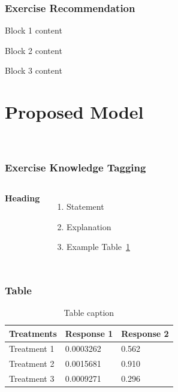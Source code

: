 \documentclass{beamer}
\begin{document}

\begin{frame}
  \frametitle{Exercise Recommendation}
  \begin{block}{Block 1}
    content
  \end{block}

  \begin{block}{Block 2}
    content
  \end{block}

  \begin{block}{Block 3}
    content
  \end{block}
\end{frame}

\section{Proposed Model}
\begin{frame}
  \
\end{frame}




\begin{frame}
  \frametitle{Exercise Knowledge Tagging}
  \begin{columns}[c] %

    \textbf{Heading}
    \begin{enumerate}
      \item Statement
      \item Explanation
      \item Example Table~\ref{tbl:t1}
    \end{enumerate}



  \end{columns}
\end{frame}

\begin{frame}
  \frametitle{Table}
  \begin{table}
    \caption{Table caption}\label{tbl:t1}
    \begin{tabular}{l l l}
      \toprule
      \textbf{Treatments} & \textbf{Response 1} & \textbf{Response 2} \\
      \midrule
      Treatment 1         & 0.0003262           & 0.562               \\
      Treatment 2         & 0.0015681           & 0.910               \\
      Treatment 3         & 0.0009271           & 0.296               \\
      \bottomrule
    \end{tabular}
  \end{table}
\end{frame}
\end{document}

